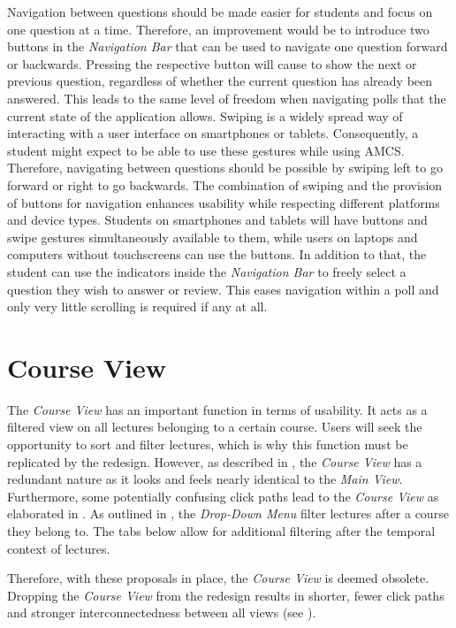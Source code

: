 Navigation between questions should be made easier for students and focus on one question at a time. Therefore, an improvement would be to introduce two buttons in the \emph{Navigation Bar} that can be used to navigate one question forward or backwards. Pressing the respective button will cause to show the next or previous question, regardless of whether the current question has already been answered. This leads to the same level of freedom when navigating polls that the current state of the application allows.
\newline
\newline
Swiping is a widely spread way of interacting with a user interface on smartphones or tablets. Consequently, a student might expect to be able to use these gestures while using AMCS. Therefore, navigating between questions should be possible by swiping left to go forward or right to go backwards. The combination of swiping and the provision of buttons for navigation enhances usability while respecting different platforms and device types. Students on smartphones and tablets will have buttons and swipe gestures simultaneously available to them, while users on laptops and computers without touchscreens can use the buttons.
In addition to that, the student can use the indicators inside the \emph{Navigation Bar} to freely select a question they wish to answer or review. This eases navigation within a poll and only very little scrolling is required if any at all.


\section{Course View}
The \emph{Course View} has an important function in terms of usability. It acts as a filtered view on all lectures belonging to a certain course. Users will seek the opportunity to sort and filter lectures, which is why this function must be replicated by the redesign. However, as described in , the \emph{Course View} has a redundant nature as it looks and feels nearly identical to the \emph{Main View}.
Furthermore, some potentially confusing click paths lead to the \emph{Course View} as elaborated in .
As outlined in , the \emph{Drop-Down Menu} filter lectures after a course they belong to. The tabs below allow for additional filtering after the temporal context of lectures. 

Therefore, with these proposals in place, the \emph{Course View} is deemed obsolete. Dropping the \emph{Course View} from the redesign results in shorter, fewer click paths and stronger interconnectedness between all views (see ).

